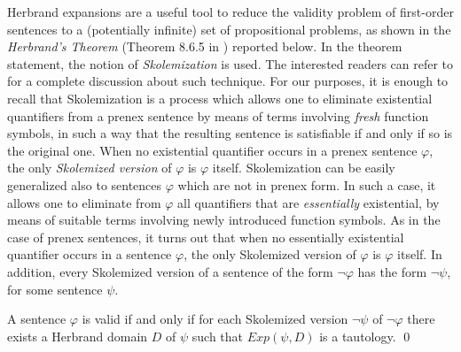\documentclass[a4paper]{llncs}
\newcommand{\HExp}{Exp}
\begin{document}
Herbrand expansions are a useful tool to reduce the validity
problem of first-order sentences to a (potentially infinite) set of
propositional problems, as shown in the \emph{Herbrand's Theorem}
(Theorem 8.6.5 in \cite{Fitting96}) reported below.
In the theorem statement, the notion of \emph{Skolemization} is
used. The interested readers can refer to \cite{NonWei2001}
for a complete discussion about such technique.
For our purposes, it is enough to recall that Skolemization is
a process which allows one to eliminate existential quantifiers from 
a prenex sentence by means of terms involving \emph{fresh} function 
symbols, in such a way that the resulting sentence is satisfiable if 
and only if so is the
original one. When no existential quantifier occurs in a prenex 
sentence $\varphi$, the only \emph{Skolemized version} of $\varphi$ is
$\varphi$ itself. Skolemization can be easily generalized also to 
sentences $\varphi$ which are not in prenex form. In such a case, it 
allows one to eliminate from $\varphi$ all quantifiers that are 
\emph{essentially} existential, by means of suitable terms involving 
newly introduced function symbols. As in the case of prenex 
sentences, it turns out that
when no essentially existential quantifier occurs in a sentence 
$\varphi$, the only Skolemized version of $\varphi$ is $\varphi$ 
itself. In addition, every Skolemized version of a sentence of the 
form $\neg \varphi$ has the form $\neg \psi$, for some sentence 
$\psi$.


\begin{theorem}\label{HERVAL}
A sentence $\varphi$ is valid if and only if for each Skolemized 
version $\neg \psi$ of $\neg \varphi$ there exists a Herbrand domain 
$D$ of $\psi$ such that $\HExp(\psi, D)$ is a tautology. \qed
\end{theorem}
\end{document}
